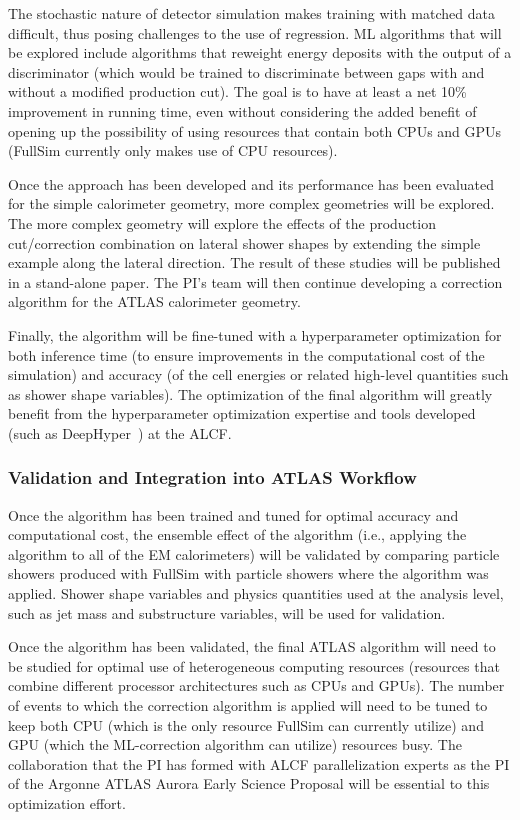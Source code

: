 \documentclass[letter, USenglish, 11pt, subfigure]{article}
\begin{document}
The stochastic nature of detector simulation makes training with matched data difficult, thus posing challenges to the use of regression. ML algorithms that will be explored include algorithms that reweight energy deposits with the output of a discriminator (which would be trained to discriminate between gaps with and without a modified production cut). The goal is to have at least a net 10\% improvement in running time, even without considering the added benefit of opening up the possibility of using resources that contain both CPUs and GPUs (FullSim currently only makes use of CPU resources).

Once the approach has been developed and its performance has been evaluated for the simple calorimeter geometry, more complex geometries will be explored. The more complex geometry will explore the effects of the production cut/correction combination on lateral shower shapes by extending the simple example along the lateral direction. The result of these studies will be published in a stand-alone paper. The PI's team will then continue developing a correction algorithm for the ATLAS calorimeter geometry.

Finally, the algorithm will be fine-tuned with a hyperparameter optimization for both inference time (to ensure improvements in the computational cost of the simulation) and accuracy (of the cell energies or related high-level quantities such as shower shape variables). The optimization of the final algorithm will greatly benefit from the hyperparameter optimization expertise and tools developed (such as DeepHyper~\cite{deephyper2,deephyper1}) at the ALCF.

\subsubsection{Validation and Integration into ATLAS Workflow}

Once the algorithm has been trained and tuned for optimal accuracy and computational cost, the ensemble effect of the algorithm (i.e., applying the algorithm to all of the EM calorimeters) will be validated by comparing particle showers produced with FullSim with particle showers where the algorithm was applied. Shower shape variables and physics quantities used at the analysis level, such as jet mass and substructure variables, will be used for validation.

Once the algorithm has been validated, the final ATLAS algorithm will need to be studied for optimal use of heterogeneous computing resources (resources that combine different processor architectures such as CPUs and GPUs). The number of events to which the correction algorithm is applied will need to be tuned to keep both CPU (which is the only resource FullSim can currently utilize) and GPU (which the ML-correction algorithm can utilize) resources busy. The collaboration that the PI has formed with ALCF parallelization experts as the PI of the Argonne ATLAS Aurora Early Science Proposal will be essential to this optimization effort. 
\end{document}
